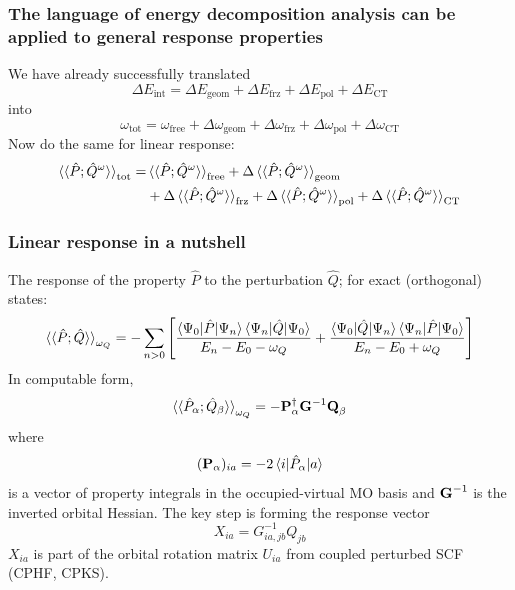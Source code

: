 \documentclass[%
    xcolor=usenames,dvipsnames,svgnames%
]{beamer}
\begin{document}
\begin{frame}
  \frametitle{The language of energy decomposition analysis can be applied to general response properties}
  We have already successfully translated
  \begin{equation*}
    \Delta E_{\text{int}} = \Delta E_{\text{geom}} + \Delta E_{\text{frz}} + \Delta E_{\text{pol}} + \Delta E_{\text{CT}}
  \end{equation*}
  into
  \begin{equation*}
    \omega_{\text{tot}} = \omega_{\text{free}} + \Delta \omega_{\text{geom}} + \Delta \omega_{\text{frz}} + \Delta \omega_{\text{pol}} + \Delta \omega_{\text{CT}}
  \end{equation*}
  Now do the same for linear response:
  \begin{equation*}
    \begin{aligned}
      \braket{\braket{\hat{P};\hat{Q}^{\omega}}}_{\text{tot}} = &\braket{\braket{\hat{P};\hat{Q}^{\omega}}}_{\text{free}} + \Delta \braket{\braket{\hat{P};\hat{Q}^{\omega}}}_{\text{geom}} \\
      &+ \Delta \braket{\braket{\hat{P};\hat{Q}^{\omega}}}_{\text{frz}} + \Delta \braket{\braket{\hat{P};\hat{Q}^{\omega}}}_{\text{pol}} + \Delta \braket{\braket{\hat{P};\hat{Q}^{\omega}}}_{\text{CT}}
    \end{aligned}
  \end{equation*}
\end{frame}

\begin{frame}
  \frametitle{Linear response in a nutshell}
  The response of the property \(\hat{P}\) to the perturbation \(\hat{Q}\); for exact (orthogonal) states:
  \begin{equation*}
    \braket{\braket{\hat{P};\hat{Q}}}_{\omega_{Q}} = - \sum_{n>0} \left[ \frac{\braket{\Psi_{0}|\hat{P}|\Psi_{n}}\braket{\Psi_{n}|\hat{Q}|\Psi_{0}}}{E_{n} - E_{0} - \omega_{Q}} + \frac{\braket{\Psi_{0}|\hat{Q}|\Psi_{n}}\braket{\Psi_{n}|\hat{P}|\Psi_{0}}}{E_{n} - E_{0} + \omega_{Q}} \right]
  \end{equation*}
  In computable form,
  \begin{equation*}
    \braket{\braket{\hat{P}_{\alpha};\hat{Q}_{\beta}}}_{\omega_{Q}} = - \boldsymbol{\mathbf{P}}_{\alpha}^{\dagger} \boldsymbol{\mathbf{G}}^{-1} \boldsymbol{\mathbf{Q}}_{\beta}
  \end{equation*}
  where
  \begin{equation*}
    (\boldsymbol{\mathbf{P}}_{\alpha})_{ia} = -2 \braket{ i | \hat{P}_{\alpha} | a }
  \end{equation*}
  is a vector of property integrals in the occupied-virtual MO basis and \(\boldsymbol{\mathbf{G}}^{-1}\) is the inverted orbital Hessian. The key step is forming the response vector
  \begin{equation*}
    X_{ia} = G_{ia,jb}^{-1} Q_{jb}
  \end{equation*}
  \(X_{ia}\) is part of the orbital rotation matrix \(U_{ia}\) from coupled perturbed SCF (CPHF, CPKS).
\end{frame}
\end{document}
